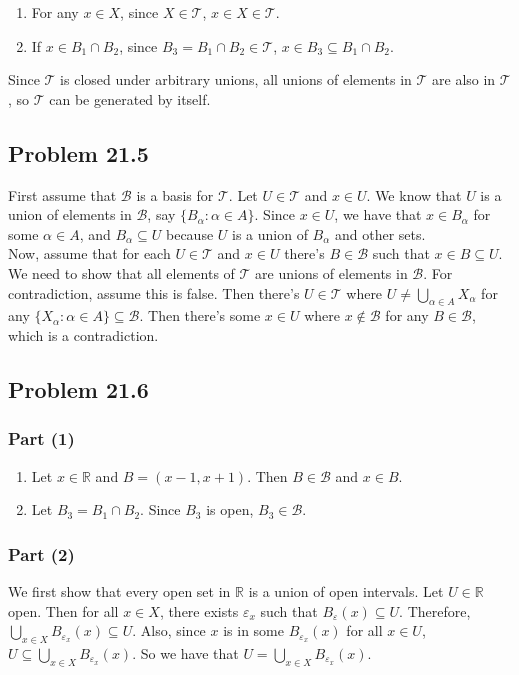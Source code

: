 \documentclass{article}
\newcommand{\R}{\mathbb{R}}
\newcommand{\T}{\mathcal{T}}
\newcommand{\B}{\mathcal{B}}
\newcommand{\eps}{\varepsilon}
\begin{document}
\begin{enumerate}
    \item For any $x \in X$, since $X \in \T$, $x \in X \in \T$.
    \item If $x \in B_1 \cap B_2$, since $B_3 = B_1 \cap B_2 \in \T$, $x \in B_3 \subseteq B_1\cap B_2$.
\end{enumerate}

Since $\T$ is closed under arbitrary unions, all unions of elements in $\T$ are also in $\T$, so $\T$ can be generated by itself.

\subsection*{Problem 21.5}
First assume that $\B$ is a basis for $\T$. Let $U \in \T$ and $x \in U$. We know that $U$ is a union of elements in $\B$, say $\{B_\alpha : \alpha \in A\}$. Since $x \in U$, we have that $x \in B_\alpha$ for some $\alpha \in A$, and $B_\alpha \subseteq U$ because $U$ is a union of $B_\alpha$ and other sets. \\

Now, assume that for each $U \in \T$ and $x \in U$ there's $B \in \B$ such that $x \in B \subseteq U$. We need to show that all elements of $\T$ are unions of elements in $\B$. For contradiction, assume this is false. Then there's $U \in \T$ where $U \neq \bigcup_{\alpha \in A} X_\alpha$ for any $\{X_\alpha : \alpha \in A\} \subseteq \B$. Then there's some $x \in U$ where $x \not \in \B$ for any $B \in \B$, which is a contradiction.

\subsection*{Problem 21.6}
\subsubsection*{Part (1)}
\begin{enumerate}
    \item Let $x \in \R$ and $B = (x - 1, x + 1)$. Then $B \in \B$ and $x \in B$.
    \item Let $B_3 = B_1 \cap B_2$. Since $B_3$ is open, $B_3 \in \B$.
\end{enumerate}

\subsubsection*{Part (2)}
We first show that every open set in $\R$ is a union of open intervals. Let $U \in \R$ open. Then for all $x \in X$, there exists $\eps_x$ such that $B_\eps(x) \subseteq U$. Therefore, $\bigcup_{x \in X} B_{\eps_x}(x) \subseteq U$. Also, since $x$ is in some $B_{\eps_x}(x)$ for all $x \in U$, $U \subseteq \bigcup_{x \in X} B_{\eps_x}(x)$. So we have that $U = \bigcup_{x \in X} B_{\eps_x}(x)$. \\
\end{document}
